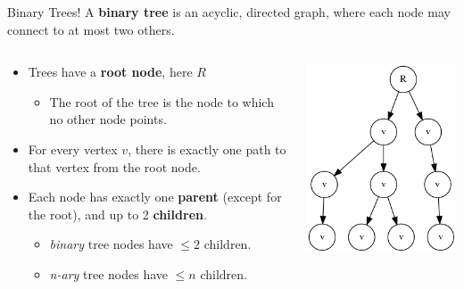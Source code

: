 \documentclass[11pt]{beamer}
\begin{document}
\begin{frame}{Binary Trees!}
A \textbf{binary tree} is an acyclic, directed graph, where each node may connect to at most two others.  
\begin{columns}
\begin{column}{0.65\textwidth}
\begin{itemize}
\item Trees have a \textbf{root node}, here $R$
\begin{itemize}
\item The root of the tree is the node to which no other node points. 
\end{itemize}
\item For every vertex $v$, there is exactly one path to that vertex from the root node.  
\item Each node has exactly one \textbf{parent} (except for the root), and up to 2 \textbf{children}.  
\begin{itemize}
\item \emph{binary} tree nodes have $\leq 2$ children. 
\item \emph{n-ary} tree nodes have $\leq n$ children.
\end{itemize}
\end{itemize}
\end{column}
\begin{column}{0.35\textwidth}
\center
\includegraphics[scale=0.4]{graphs/tree.png}
\end{column}
\end{columns}
\end{frame}
\end{document}
